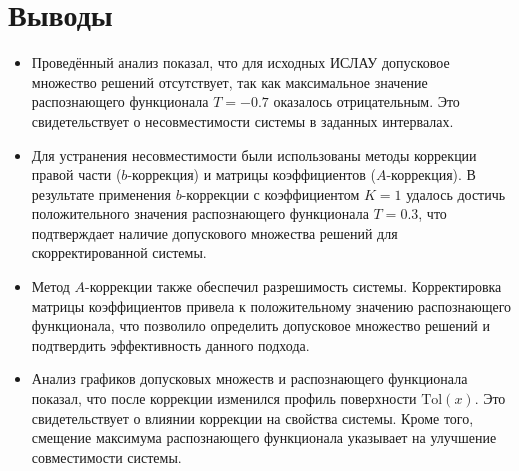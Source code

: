\documentclass{article}
\begin{document}
\section{Выводы}

\begin{itemize}
  \item Проведённый анализ показал, что для исходных ИСЛАУ допусковое множество решений отсутствует, так как максимальное значение распознающего функционала \( T = -0.7 \) оказалось отрицательным. Это свидетельствует о несовместимости системы в заданных интервалах.
  \item Для устранения несовместимости были использованы методы коррекции правой части (\( b \)-коррекция) и матрицы коэффициентов (\( A \)-коррекция). В результате применения \( b \)-коррекции с коэффициентом \( K = 1 \) удалось достичь положительного значения распознающего функционала \( T = 0.3 \), что подтверждает наличие допускового множества решений для скорректированной системы.
  \item Метод \( A \)-коррекции также обеспечил разрешимость системы. Корректировка матрицы коэффициентов привела к положительному значению распознающего функционала, что позволило определить допусковое множество решений и подтвердить эффективность данного подхода.
  \item Анализ графиков допусковых множеств и распознающего функционала показал, что после коррекции изменился профиль поверхности \( \text{Tol}(x) \). Это свидетельствует о влиянии коррекции на свойства системы. Кроме того, смещение максимума распознающего функционала указывает на улучшение совместимости системы.
\end{itemize}
\end{document}
